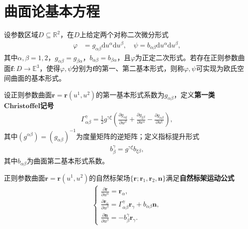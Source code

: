\documentclass[../../main.tex]{subfiles}%
\begin{document}
\section{曲面论基本方程}

\begin{definition}
设参数区域$D\subseteq\mathbb{R}^2$，在$D$上给定两个对称二次微分形式
\begin{align}
\varphi &= g_{\alpha\beta}\mathrm{d}u^\alpha\mathrm{d}u^\beta,\quad \psi = b_{\alpha\beta}\mathrm{d}u^\alpha\mathrm{d}u^\beta, \label{eq:form_def}
\end{align}
其中$\alpha,\beta=1,2$，$g_{\alpha\beta}=g_{\beta\alpha}$，$b_{\alpha\beta}=b_{\beta\alpha}$，且$\varphi$为正定二次形式。若存在正则参数曲面$\boldsymbol{f}:D\to\mathbb{E}^3$，使得$\varphi,\psi$分别为$\boldsymbol{f}$的第一、第二基本形式，则称$\varphi,\psi$可实现为欧氏空间曲面的基本形式。
\end{definition}

\begin{definition}
设正则参数曲面$\boldsymbol{r}=\boldsymbol{r}(u^1,u^2)$的第一基本形式系数为$g_{\alpha\beta}$，定义\textbf{第一类}$\mathbf{Christoffel}$\textbf{记号}
\begin{align}
\Gamma^\gamma_{\alpha\beta} = \frac{1}{2}g^{\gamma\xi}\left(\frac{\partial g_{\alpha\xi}}{\partial u^\beta}+\frac{\partial g_{\xi\beta}}{\partial u^\alpha}-\frac{\partial g_{\alpha\beta}}{\partial u^\xi}\right), \label{eq:christoffel}
\end{align}
其中$(g^{\alpha\beta})=(g_{\alpha\beta})^{-1}$为度量矩阵的逆矩阵；定义指标提升形式
\begin{align*}
b^\gamma_\beta = g^{\gamma\xi}b_{\xi\beta},
\end{align*}
其中$b_{\alpha\beta}$为曲面第二基本形式系数。
\end{definition}

\begin{proposition}
正则参数曲面$\boldsymbol{r}=\boldsymbol{r}(u^1,u^2)$的自然标架场$\{\boldsymbol{r};\boldsymbol{r}_1,\boldsymbol{r}_2,\boldsymbol{n}\}$满足\textbf{自然标架运动公式}
\begin{align}
\begin{cases}
\frac{\partial \boldsymbol{r}}{\partial u^\alpha} = \boldsymbol{r}_\alpha,\\
\frac{\partial \boldsymbol{r}_\alpha}{\partial u^\beta} = \Gamma^\gamma_{\alpha\beta}\boldsymbol{r}_\gamma + b_{\alpha\beta}\boldsymbol{n},\\
\frac{\partial \boldsymbol{n}}{\partial u^\beta} = -b^\gamma_\beta\boldsymbol{r}_\gamma.
\end{cases} \label{eq:motion_formula111}
\end{align}
\end{proposition}
\end{document}
